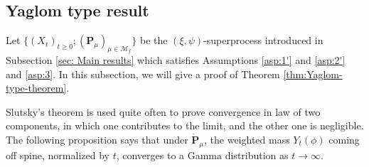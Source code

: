 \documentclass[UTF8]{pkuthss}
\theoremstyle{plain}
\theoremstyle{definition}
\numberwithin{equation}{section}
\begin{document}
\subsection{Yaglom type result}
	Let $\{(X_t)_{t\geq 0}; (\mathbf P_\mu)_{\mu \in \mathcal M_f}\}$ be the $(\xi,\psi)$-superprocess introduced in Subsection \ref{sec: Main results} which satisfies Assumptions \ref{asp:1'} and \ref{asp:2'} and \ref{asp:3}.
	In this subsection, we will give a proof of Theorem \ref{thm:Yaglom-type-theorem}.

Slutsky's theorem is used quite often to  prove convergence in law of two components, in which one contributes to the limit, and the other one is negligible. The following proposition says that under $\dot {\mathbf P}_\mu$, 
the weighted  mass  $Y_t(\phi)$ coming off spine, normalized by $t$, converges to a Gamma distribution as $t\to\infty$.
\end{document}
